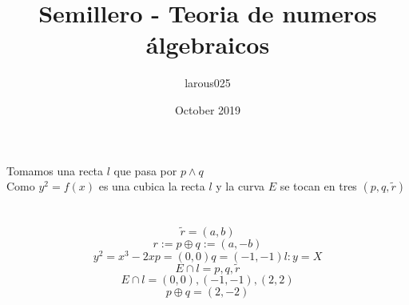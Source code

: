 \documentclass{article}
\title{Semillero - Teoria de numeros álgebraicos}
\author{larous025 }
\date{October 2019}
\begin{document}
\maketitle

\section{}
Tomamos una recta $l$ que pasa por $p \land q$ \\
Como $y^2 = f(x)$ es una cubica la recta $l$ y la curva $E$ se tocan en tres $(p,q,\widetilde{r})$ 
\section{}
\begin{equation*}
\widetilde{r}=(a,b)     
\end{equation*}
\begin{equation*}
    r:= p \oplus q := (a,-b)
\end{equation*}
\begin{equation*}
    y^2=x^3-2x p=(0,0) q=(-1,-1) l: y=X
\end{equation*}
\begin{equation*}
    E \cap l = {p,q,\widetilde{r}}
\end{equation*}
\begin{equation*}
    E \cap l = {(0,0),(-1,-1),(2,2)}
\end{equation*}
\begin{equation*}
    p \oplus q=(2,-2)
\end{equation*}
\end{document}
